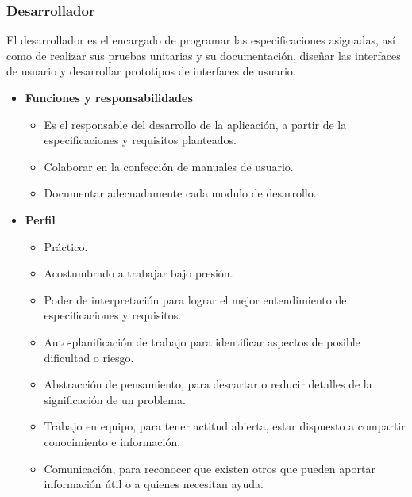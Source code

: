 		\subsubsection{Desarrollador}
        El desarrollador es el encargado de programar las especificaciones asignadas, así como de realizar sus pruebas unitarias y su documentación, diseñar las interfaces de usuario y desarrollar prototipos de interfaces de usuario.
		\begin{itemize}
			\item \textbf{Funciones y responsabilidades}
            	\begin{itemize}
                    \item Es el responsable del desarrollo de la aplicación, a partir de la especificaciones y requisitos planteados.
                    \item Colaborar en la confección de manuales de usuario.
                    \item Documentar adecuadamente cada modulo de desarrollo.
				\end{itemize}
            
            \item \textbf{Perfil}
                \begin{itemize}
                    \item Práctico.
                    \item Acostumbrado a trabajar bajo presión.
                    \item Poder de interpretación para lograr el mejor entendimiento de especificaciones y requisitos.
                    \item Auto-planificación de trabajo para identificar aspectos de posible dificultad o riesgo.
                    \item Abstracción de pensamiento, para descartar o reducir detalles de la significación de un problema.
                    \item Trabajo en equipo, para tener actitud abierta, estar dispuesto a compartir conocimiento e información.
                    \item Comunicación, para reconocer que existen otros que pueden aportar información útil o a quienes necesitan ayuda.


\end{itemize}
\end{itemize}
